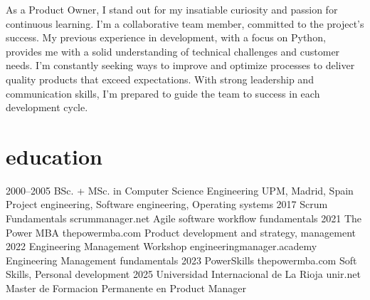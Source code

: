 \documentclass[]{friggeri-cv}
\begin{document}
As a Product Owner, {\headingfont I stand out for my insatiable curiosity and passion for continuous learning}. I'm a collaborative team member, {\headingfont committed to the project's success}. My previous experience in development, with a focus on Python, provides me with a {\headingfont solid understanding of technical challenges and customer needs}. I'm constantly seeking ways to improve and optimize processes to deliver quality products that exceed expectations. With {\headingfont strong leadership and communication skills}, I'm prepared to guide the team to success in each development cycle. \\


\section{education}

\begin{entrylist}
\entry
{2000--2005}
{BSc. + MSc. {\normalfont in Computer Science Engineering}}
{UPM, Madrid, Spain}
{Project engineering, Software engineering, Operating systems}
\entry
{2017}
{{\normalfont Scrum Fundamentals}}
{scrummanager.net}
{Agile software workflow fundamentals}
\entry
{2021}
{{\normalfont The Power MBA}}
{thepowermba.com}
{Product development and strategy, management}
\entry
{2022}
{{\normalfont Engineering Management Workshop}}
{engineeringmanager.academy}
{Engineering Management fundamentals}
\entry
{2023}
{{\normalfont PowerSkills}}
{thepowermba.com}
{Soft Skills, Personal development}
\entry
{2025}
{{\normalfont Universidad Internacional de La Rioja}}
{unir.net}
{Master de Formacion Permanente en Product Manager}

\end{entrylist}

\end{document}
